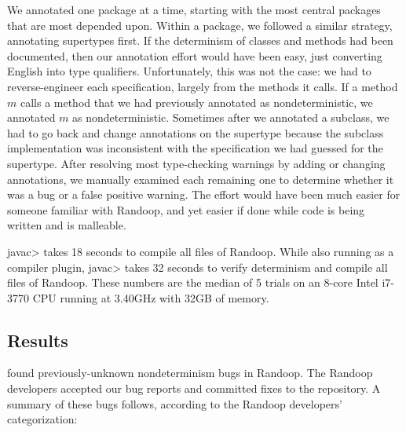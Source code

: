 We annotated one package at a time, starting with the most central packages
that are most depended upon.  Within a package, we followed a similar
strategy, annotating supertypes first.  If the determinism of classes and methods had been
documented, then our annotation effort
would have been easy, just converting English into type qualifiers.
Unfortunately, this was not the case: we had to reverse-engineer each
specification, largely from the methods it calls.  If a method $m$ calls a
method that we had previously annotated as nondeterministic, we annotated
$m$ as nondeterministic.
Sometimes after we
annotated a subclass, we had to go back and change annotations on
the supertype because the subclass implementation was
inconsistent with the specification we had guessed for the supertype.
After resolving most type-checking warnings by adding or changing
annotations, we manually examined each remaining one to determine whether
it was a bug or a false positive warning.
The effort would have been much easier for someone familiar with Randoop,
and yet easier if done while code is being written and is malleable.

\<javac> takes 18 seconds to compile all files of Randoop.
While also running \theDeterminismChecker as a compiler plugin, \<javac> takes 32 seconds to verify determinism and compile all files of Randoop.
These numbers are the median of 5 trials on an 8-core Intel i7-3770 CPU running at 3.40GHz with 
32GB of memory.


\subsection{Results}

\TheDeterminismChecker found \numRandoopBugs previously-unknown nondeterminism bugs in Randoop.
The Randoop developers accepted our bug reports and committed fixes to the repository. A summary
of these bugs follows, according to the Randoop developers' categorization:

